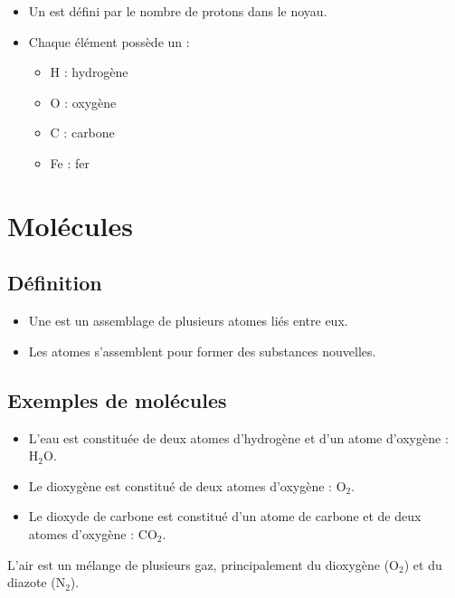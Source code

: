 \documentclass[12pt]{article}
\begin{document}
\begin{itemize}
    \item Un  est défini par le nombre de protons dans le noyau.
    \item Chaque élément possède un  :
    \begin{itemize}
        \item H : hydrogène
        \item O : oxygène
        \item C : carbone
        \item Fe : fer
    \end{itemize}
\end{itemize}

\section{Molécules}

\subsection{Définition}

\begin{itemize}
    \item Une  est un assemblage de plusieurs atomes liés entre eux.
    \item Les atomes s’assemblent pour former des substances nouvelles.
\end{itemize}

\subsection{Exemples de molécules}

\begin{itemize}
    \item L’eau est constituée de deux atomes d’hydrogène et d’un atome d’oxygène : \(\mathrm{H_2O}\).
    \item Le dioxygène est constitué de deux atomes d’oxygène : \(\mathrm{O_2}\).
    \item Le dioxyde de carbone est constitué d’un atome de carbone et de deux atomes d’oxygène : \(\mathrm{CO_2}\).
\end{itemize}

\begin{exemple}{}{}
    L’air est un mélange de plusieurs gaz, principalement du dioxygène (\(\mathrm{O_2}\)) et du diazote (\(\mathrm{N_2}\)).
\end{exemple}
\end{document}
